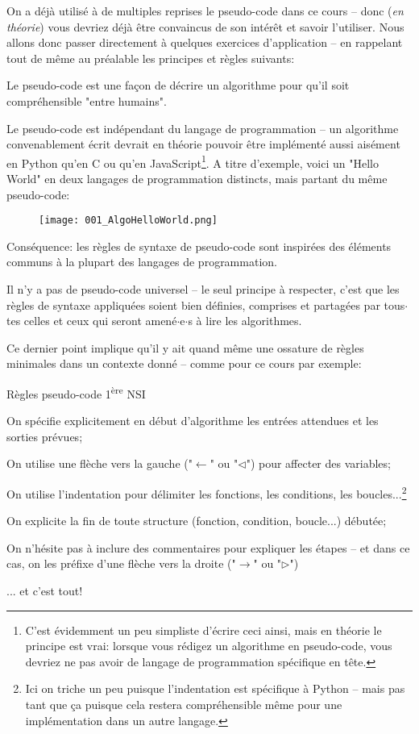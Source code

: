 \documentclass[12pt]{article}
\begin{document}
	On a déjà utilisé à de multiples reprises le pseudo-code dans ce cours -- donc (\textit{en théorie}) vous devriez déjà être convaincus de son intérêt et savoir l'utiliser. Nous allons donc passer directement à quelques exercices d'application -- en rappelant tout de même au préalable les principes et règles suivants:
	\begin{alphenum}
		\item Le pseudo-code est une façon de décrire un algorithme pour qu'il soit compréhensible "entre humains".
		\item Le pseudo-code est indépendant du langage de programmation -- un algorithme convenablement écrit devrait en théorie pouvoir être implémenté aussi aisément en Python qu'en C ou qu'en JavaScript\footnote{C'est évidemment un peu simpliste d'écrire ceci ainsi, mais en théorie le principe est vrai: lorsque vous rédigez un algorithme en pseudo-code, vous devriez ne pas avoir de langage de programmation spécifique en tête.}. A titre d'exemple, voici un "Hello World" en deux langages de programmation distincts, mais partant du même pseudo-code:
		\begin{figure}[ht]
			\centering
			\texttt{[image: 001\_AlgoHelloWorld.png]}
		\end{figure}
		\item Conséquence: les règles de syntaxe de pseudo-code sont inspirées des éléments communs à la plupart des langages de programmation.
		\item Il n'y a pas de pseudo-code universel -- le seul principe à respecter, c'est que les règles de syntaxe appliquées soient bien définies, comprises et partagées par tous$\cdot$tes celles et ceux qui seront amené$\cdot$e$\cdot$s à lire les algorithmes.
	\end{alphenum}
	
	Ce dernier point implique qu'il y ait quand même une ossature de règles minimales dans un contexte donné -- comme pour ce cours par exemple:
	\begin{MonAmp}{Règles pseudo-code 1\textsuperscript{ère} NSI}
		\begin{alphenum}
			\item On spécifie explicitement en début d'algorithme les entrées attendues et les sorties prévues;
			\item On utilise une flèche vers la gauche ("$\leftarrow$" ou "$\lhd$") pour affecter des variables;
			\item On utilise l'indentation pour délimiter les fonctions, les conditions, les boucles...\footnote{Ici on triche un peu puisque l'indentation est spécifique à Python -- mais pas tant que ça puisque cela restera compréhensible même pour une implémentation dans un autre langage.}
			\item On explicite la fin de toute structure (fonction, condition, boucle...) débutée;
			\item On n'hésite pas à inclure des commentaires pour expliquer les étapes -- et dans ce cas, on les préfixe d'une flèche vers la droite ("$\rightarrow$" ou "$\rhd$")
			\item ... et c'est tout!
		\end{alphenum}
	\end{MonAmp}	 
	
\end{document}
